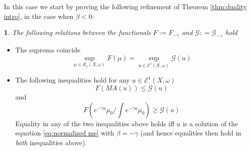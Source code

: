 \documentclass[11pt,oneside,english]{amsart}
\numberwithin{equation}{section}
\numberwithin{figure}{section}
\theoremstyle{plain}
\newtheorem{thm}{\protect\theoremname}[section]
\theoremstyle{plain}
\theoremstyle{plain}
\theoremstyle{plain}
\theoremstyle{remark}
\theoremstyle{definition}
\providecommand{\theoremname}{Theorem}
\begin{document}
In this case we start by proving the following refinement of Theorem
\ref{thm:duality intro}, in the case when $\beta<0:$
\begin{thm}
\label{thm:f and g when beta neg}The following relations between
the functionals $F:=F_{-\gamma}$ and $\mathcal{G}:\mathcal{=}\mathcal{G}_{-\gamma}$
hold \end{thm}
\begin{itemize}
\item The suprema coincide
\begin{equation}
\sup_{\mu\in E_{1}(X,\omega)}F(\mu)=\sup_{u\in\mathcal{E}^{1}(X,\omega)}\mathcal{G}(u)\label{eq:same sup for beta neg}
\end{equation}
 
\item The following inequalities hold for any $u\in\mathcal{E}^{1}(X,\omega)$
\begin{equation}
F(MA(u))\leq\mathcal{G}(u)\label{eq:f smal then g}
\end{equation}
 and 
\begin{equation}
F(e^{-\gamma u}\mu_{0}/\int e^{-\gamma u}\mu_{0})\geq\mathcal{G}(u)\label{eq:lower bound on F by G}
\end{equation}
 Equality in any of the two inequalities above holds iff $u$ is a
solution of the  equation \ref{eq:normalized me} with $\beta=-\gamma$
(and hence equalities then hold in \emph{both} inequalities above). \end{itemize}
\end{document}
